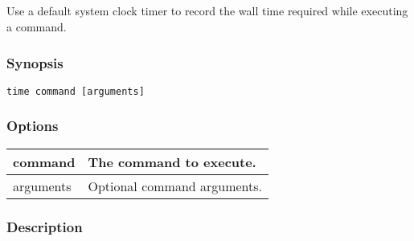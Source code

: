\subsection{}
\label{time}
Use a default system clock timer to record the wall time required while executing a command. 
\subsubsection*{Synopsis}
\begin{verbatim}
time command [arguments]
\end{verbatim}
\subsubsection*{Options}
\begin{tabular}{|l|l|}
\hline 
 command  & The command to execute.  \\
 \hline 
 arguments  & Optional command arguments.  \\
 \hline 
\end{tabular}
\subsubsection*{Description}
